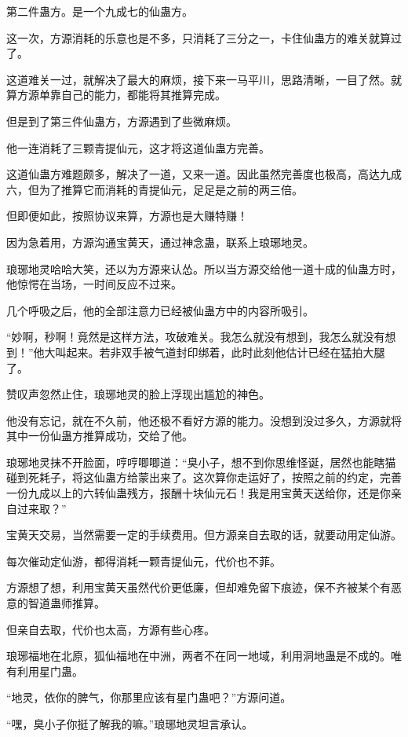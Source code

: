 \begin{this_body}
第二件蛊方。是一个九成七的仙蛊方。

这一次，方源消耗的乐意也是不多，只消耗了三分之一，卡住仙蛊方的难关就算过了。

这道难关一过，就解决了最大的麻烦，接下来一马平川，思路清晰，一目了然。就算方源单靠自己的能力，都能将其推算完成。

但是到了第三件仙蛊方，方源遇到了些微麻烦。

他一连消耗了三颗青提仙元，这才将这道仙蛊方完善。

这道仙蛊方难题颇多，解决了一道，又来一道。因此虽然完善度也极高，高达九成六，但为了推算它而消耗的青提仙元，足足是之前的两三倍。

但即便如此，按照协议来算，方源也是大赚特赚！

因为急着用，方源沟通宝黄天，通过神念蛊，联系上琅琊地灵。

琅琊地灵哈哈大笑，还以为方源来认怂。所以当方源交给他一道十成的仙蛊方时，他惊愕在当场，一时间反应不过来。

几个呼吸之后，他的全部注意力已经被仙蛊方中的内容所吸引。

“妙啊，秒啊！竟然是这样方法，攻破难关。我怎么就没有想到，我怎么就没有想到！”他大叫起来。若非双手被气道封印绑着，此时此刻他估计已经在猛拍大腿了。

赞叹声忽然止住，琅琊地灵的脸上浮现出尴尬的神色。

他没有忘记，就在不久前，他还极不看好方源的能力。没想到没过多久，方源就将其中一份仙蛊方推算成功，交给了他。

琅琊地灵抹不开脸面，哼哼唧唧道：“臭小子，想不到你思维怪诞，居然也能瞎猫碰到死耗子，将这仙蛊方给蒙出来了。这次算你走运好了，按照之前的约定，完善一份九成以上的六转仙蛊残方，报酬十块仙元石！我是用宝黄天送给你，还是你亲自过来取？”

宝黄天交易，当然需要一定的手续费用。但方源亲自去取的话，就要动用定仙游。

每次催动定仙游，都得消耗一颗青提仙元，代价也不菲。

方源想了想，利用宝黄天虽然代价更低廉，但却难免留下痕迹，保不齐被某个有恶意的智道蛊师推算。

但亲自去取，代价也太高，方源有些心疼。

琅琊福地在北原，狐仙福地在中洲，两者不在同一地域，利用洞地蛊是不成的。唯有利用星门蛊。

“地灵，依你的脾气，你那里应该有星门蛊吧？”方源问道。

“嘿，臭小子你挺了解我的嘛。”琅琊地灵坦言承认。


\end{this_body}
